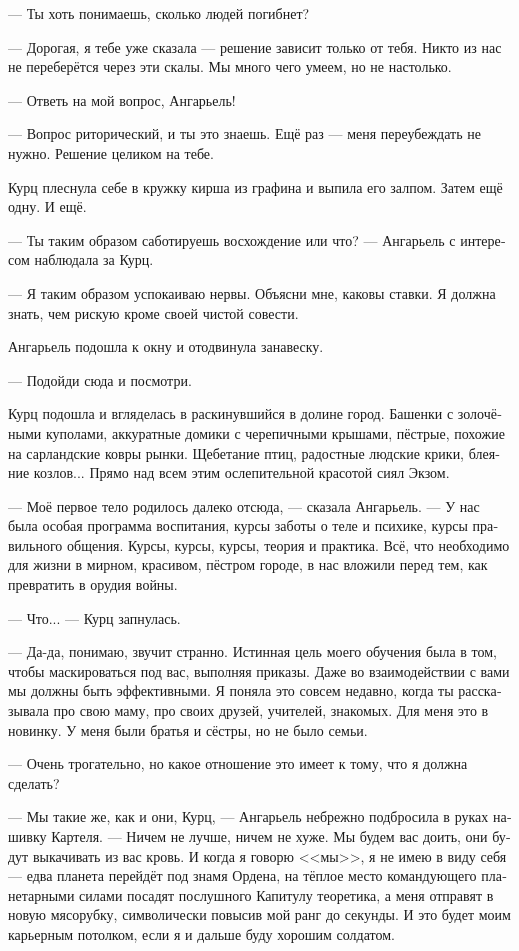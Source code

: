 \documentclass[a4paper,12pt,fleqn]{book}\usepackage{polyglossia}\setdefaultlanguage[babelshorthands=true]{russian}\setotherlanguage{english}\defaultfontfeatures{Ligatures=TeX,Mapping=tex-text}\usepackage{xcolor}\newcommand{\ml}[3]{#2}
\begin{document}
--- Ты хоть понимаешь, сколько людей погибнет?

--- Дорогая, я тебе уже сказала --- решение зависит только от тебя.
Никто из нас не переберётся через эти скалы.
Мы много чего умеем, но не настолько.

--- Ответь на мой вопрос, Ангарьель!

--- Вопрос риторический, и ты это знаешь.
Ещё раз --- меня переубеждать не нужно.
Решение целиком на тебе.

Курц плеснула себе в кружку кирша из графина и выпила его залпом.
Затем ещё одну.
И ещё.

--- Ты таким образом саботируешь восхождение или что? --- Ангарьель с интересом наблюдала за Курц.

--- Я таким образом успокаиваю нервы.
Объясни мне, каковы ставки.
Я должна знать, чем рискую кроме своей чистой совести.

Ангарьель подошла к окну и отодвинула занавеску.

--- Подойди сюда и посмотри.

Курц подошла и вгляделась в раскинувшийся в долине город.
Башенки с золочёными куполами, аккуратные домики с черепичными крышами, пёстрые, похожие на сарландские ковры рынки.
Щебетание птиц, радостные людские крики, блеяние козлов...
Прямо над всем этим ослепительной красотой сиял Экзом.

--- Моё первое тело родилось далеко отсюда, --- сказала Ангарьель.
--- У нас была особая программа воспитания, курсы заботы о теле и психике, курсы правильного общения.
Курсы, курсы, курсы, теория и практика.
Всё, что необходимо для жизни в мирном, красивом, пёстром городе, в нас вложили перед тем, как превратить в орудия войны.

--- Что... --- Курц запнулась.

--- Да-да, понимаю, звучит странно.
Истинная цель моего обучения была в том, чтобы маскироваться под вас, выполняя приказы.
Даже во взаимодействии с вами мы должны быть эффективными.
Я поняла это совсем недавно, когда ты рассказывала про свою маму, про своих друзей, учителей, знакомых.
Для меня это в новинку.
У меня были братья и сёстры, но не было семьи.

--- Очень трогательно, но какое отношение это имеет к тому, что я должна сделать?

--- Мы такие же, как и они, Курц, --- Ангарьель небрежно подбросила в руках нашивку Картеля.
--- Ничем не лучше, ничем не хуже.
\ml{$0$}
{Мы будем вас доить, они будут выкачивать из вас кровь.}
{We milk you, they make you bleed.}
И когда я говорю <<мы>>, я не имею в виду себя --- едва планета перейдёт под знамя Ордена, на тёплое место командующего планетарными силами посадят послушного Капитулу теоретика, а меня отправят в новую мясорубку, символически повысив мой ранг до секунды.
И это будет моим карьерным потолком, если я и дальше буду хорошим солдатом.
\end{document}
